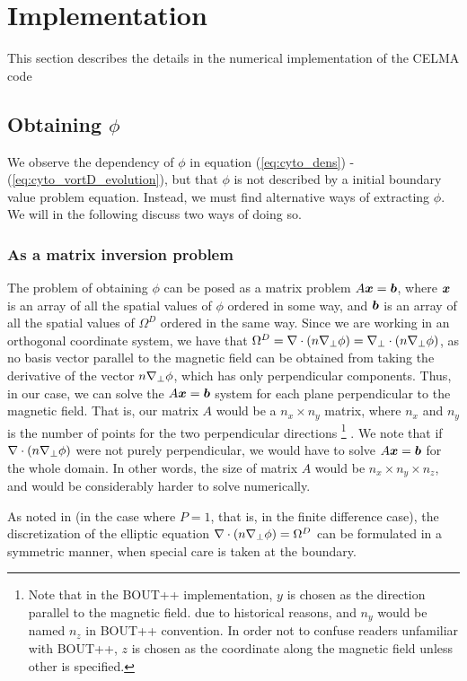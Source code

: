 \section{Implementation}
\label{sec:implementation}
This section describes the details in the numerical implementation of the CELMA
code

\subsection{Obtaining \texorpdfstring{$\phi$}{the potential}}
%
We observe the dependency of $\phi$ in equation (\ref{eq:cyto_dens}) -
(\ref{eq:cyto_vortD_evolution}), but that $\phi$ is not described by a
initial boundary value problem equation. Instead, we must find alternative ways
of extracting $\phi$. We will in the following discuss two ways of doing so.


\subsubsection{As a matrix inversion problem}
%
The problem of obtaining $\phi$ can be posed as a matrix problem
$A\boldsymbol{x}=\boldsymbol{b}$, where $\boldsymbol{x}$ is an array of all the spatial values of
$\phi$ ordered in some way, and $\boldsymbol{b}$ is an array of all the spatial values
of $\Omega^D$ ordered in the same way. Since we are working in an orthogonal
coordinate system, we have that $\Omega^D = \nabla\cdot\left(n\nabla_\perp\phi\right) =
\nabla_\perp\cdot\left(n\nabla_\perp\phi\right)$, as no basis vector parallel to the
magnetic field can be obtained from taking the derivative of the vector
$n\nabla_\perp\phi$, which has only perpendicular components. Thus, in our case,
we can solve the $A\boldsymbol{x}=\boldsymbol{b}$ system for each plane perpendicular to the
magnetic field. That is, our matrix $A$ would be a $n_x \times n_y$ matrix,
where $n_x$ and $n_y$ is the number of points for the two perpendicular
directions
%
\footnote{
Note that in the BOUT++ implementation, $y$ is chosen as the direction parallel
to the magnetic field.  due to historical reasons, and $n_y$ would be named
$n_z$ in BOUT++ convention.  In order not to confuse readers unfamiliar with
BOUT++, $z$ is chosen as the coordinate along the magnetic field unless other
is specified.
}%
%
. We note that if $\nabla\cdot\left(n\nabla_\perp\phi\right)$ were not purely
perpendicular, we would have to solve $A\boldsymbol{x}=\boldsymbol{b}$ for the whole domain. In
other words, the size of matrix $A$ would be $n_x \times n_y \times n_z$, and
would be considerably harder to solve numerically.

As noted in \cite{Wiesenberger2014Phd} (in the case where $P=1$, that is, in
the finite difference case), the discretization of the elliptic equation
$\nabla\cdot\left(n\nabla_\perp\phi\right)=\Omega^D$ can be formulated in a symmetric manner,
when special care is taken at the boundary.

